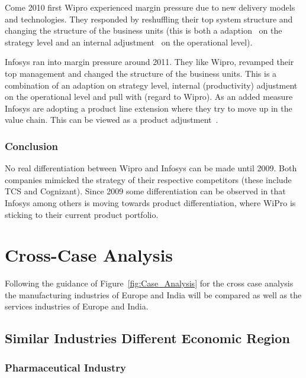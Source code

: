 Come 2010 first Wipro experienced margin pressure due to new delivery models and technologies.
They responded by reshuffling their top system structure and changing the structure of the business units (this is both a adaption~\citep{Cantwell:2009hg} on the strategy level and an internal adjustment~\citep{Lawton:2009vw} on the operational level).

Infosys ran into margin pressure around 2011.
They like Wipro, revamped their top management and changed the structure of the business units.
This is a combination of an adaption on strategy level, internal (productivity) adjustment~\citep{Lawton:2009vw} on the operational level and \iso pull with (regard to Wipro).
As an added measure Infosys are adopting a product line extension where they try to move up in the value chain. 
This can be viewed as a product adjustment~\citep{Lawton:2009vw}. 

\subsubsection{Conclusion}
No real differentiation between Wipro and Infosys can be made until 2009.
Both companies mimicked the strategy of their respective competitors (these include TCS and Cognizant).
Since 2009 some differentiation can be observed in that Infosys among others is moving towards product differentiation, where WiPro is sticking to their current product portfolio.



\section{Cross-Case Analysis}
Following the guidance of Figure~\ref{fig:Case_Analysis} for the cross case analysis the manufacturing industries of Europe and India will be compared as well as the services industries of Europe and India.

\subsection{Similar Industries Different Economic Region}

\subsubsection{Pharmaceutical Industry}

